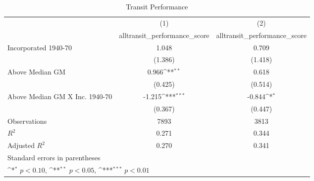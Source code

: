 \begin{table}[htbp]\centering
\def\sym#1{\ifmmode^{#1}\else\(^{#1}\)\fi}
\caption{Transit Performance}
\begin{tabular}{l*{2}{c}}
\hline\hline
                    &\multicolumn{1}{c}{(1)}&\multicolumn{1}{c}{(2)}\\
                    &\multicolumn{1}{c}{alltransit\_performance\_score}&\multicolumn{1}{c}{alltransit\_performance\_score}\\
\hline
Incorporated 1940-70&       1.048         &       0.709         \\
                    &     (1.386)         &     (1.418)         \\
[1em]
Above Median GM     &       0.966\sym{**} &       0.618         \\
                    &     (0.425)         &     (0.514)         \\
[1em]
Above Median GM X Inc. 1940-70&      -1.215\sym{***}&      -0.844\sym{*}  \\
                    &     (0.367)         &     (0.447)         \\
\hline
Observations        &        7893         &        3813         \\
\(R^{2}\)           &       0.271         &       0.344         \\
Adjusted \(R^{2}\)  &       0.270         &       0.341         \\
\hline\hline
\multicolumn{3}{l}{\footnotesize Standard errors in parentheses}\\
\multicolumn{3}{l}{\footnotesize \sym{*} \(p<0.10\), \sym{**} \(p<0.05\), \sym{***} \(p<0.01\)}\\
\end{tabular}
\end{table}
